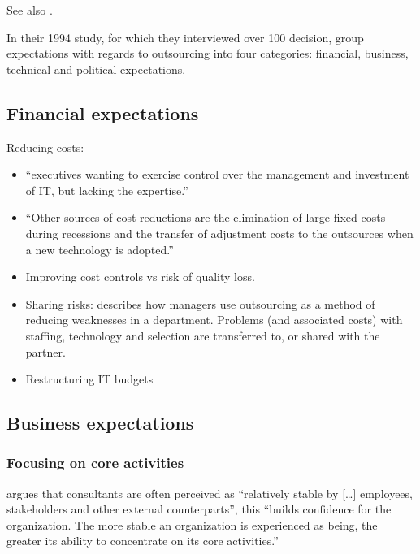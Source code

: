 \documentclass[12pt]{article}
\begin{document}
See also \citep{bessant1995}.

In their 1994 study, for which they interviewed over 100 decision,
\citet[10-17]{lacity1994} group expectations with regards to outsourcing
into four categories: financial, business, technical and political
expectations.

\hypertarget{financial-expectations}{%
\subsection{Financial expectations}\label{financial-expectations}}

Reducing costs:

\begin{itemize}
\item
  ``executives wanting to exercise control over the management and
  investment of IT, but lacking the expertise.'' \citep[
  233]{sturdy1998}
\item
  ``Other sources of cost reductions are the elimination of large fixed
  costs during recessions and the transfer of adjustment costs to the
  outsources when a new technology is adopted.'' \citep{aubert1996}
\item
  Improving cost controls vs risk of quality loss. \citep[
  454]{ketler1993}
\item
  Sharing risks: \citet[454]{ketler1993} describes how managers use
  outsourcing as a method of reducing weaknesses in a department.
  Problems (and associated costs) with staffing, technology and
  selection are transferred to, or shared with the partner.
\item
  Restructuring IT budgets
\end{itemize}

\hypertarget{business-expectations}{%
\subsection{Business expectations}\label{business-expectations}}

\hypertarget{focusing-on-core-activities}{%
\subsubsection{Focusing on core
activities}\label{focusing-on-core-activities}}

\citet[272-273]{furusten2009} argues that consultants are often
perceived as ``relatively stable by {[}\ldots{]} employees, stakeholders
and other external counterparts'', this ``builds confidence for the
organization. The more stable an organization is experienced as being,
the greater its ability to concentrate on its core activities.''
\end{document}
